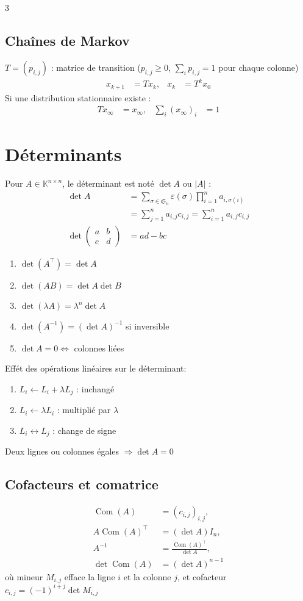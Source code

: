 \documentclass[12pt, a4paper]{article}
\newcommand{\KK}{\mathbb{K}}
\newcommand{\Com}{\operatorname{Com}}
\begin{document}
\begin{multicols*}{3}
\subsection{Chaînes de Markov}
$T=(p_{i,j})$ : matrice de transition ($p_{i,j}\ge0$, $\sum_i p_{i,j}=1$ pour chaque colonne)
\begin{align*}
x_{k+1}&=Tx_k, &x_k&=T^k x_0
\end{align*}
Si une distribution stationnaire existe :
\begin{align*}
Tx_\infty&=x_\infty,&\sum_i(x_\infty)_i&=1
\end{align*}

\colbreak
\section{Déterminants}
Pour $A\in\KK^{n\times n}$, le déterminant est noté $\det A$ ou $|A|$ :
\begin{align*}
\det A&=\sum_{\sigma\in\mathfrak S_n}\varepsilon(\sigma)
\prod_{i=1}^n a_{i,\sigma(i)}\\
      &= \sum_{j=1}^n a_{i,j}c_{i,j} =\sum_{i=1}^n a_{i,j}c_{i,j}\\
\det\begin{pmatrix}a&b\\c&d\end{pmatrix}&=ad-bc
\end{align*}
\begin{enumerate}
\item $\det(A^\top)=\det A$
\item $\det(AB)=\det A\det B$
\item $\det(\lambda A)=\lambda^n\det A$
\item $\det(A^{-1})=(\det A)^{-1}$ si inversible
\item $\det A=0\iff$ colonnes liées
\end{enumerate}

Effét des opérations linéaires sur le déterminant:
\begin{enumerate}
\item $L_i\leftarrow L_i+\lambda L_j$ : inchangé
\item $L_i\leftarrow\lambda L_i$ : multiplié par $\lambda$
\item $L_i\leftrightarrow L_j$ : change de signe
\end{enumerate}
Deux lignes ou colonnes égales $\Rightarrow\det A=0$

\subsection{Cofacteurs et comatrice}
\vspace{-2em}
\begin{align*}
\Com(A)&=(c_{i,j})_{i,j},\\
A\Com(A)^\top&=(\det A)I_n,\\
A^{-1}&=\frac{\Com(A)^\top}{\det A},\\
\det\Com(A)&=(\det A)^{n-1}
\end{align*}
où mineur $M_{i,j}$ efface la ligne $i$ et la colonne $j$, et  cofacteur $c_{i,j}=(-1)^{i+j}\det M_{i,j}$ 


\end{multicols*}
\end{document}
